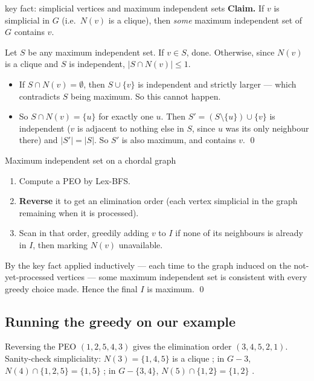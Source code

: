 \begin{facts}{key fact: simplicial vertices and maximum independent sets}
\textbf{Claim.} If $v$ is simplicial in $G$ (i.e.\ $N(v)$ is a clique), then \emph{some} maximum
independent set of $G$ contains $v$.

\prf Let $S$ be any maximum independent set. If $v\in S$, done. Otherwise, since $N(v)$ is a
clique and $S$ is independent, $|S\cap N(v)|\le1$.
\begin{itemize}
  \item If $S\cap N(v)=\emptyset$, then $S\cup\{v\}$ is independent and strictly larger --- which
        contradicts $S$ being maximum. So this cannot happen.
  \item So $S\cap N(v)=\{u\}$ for exactly one $u$. Then $S'=(S\setminus\{u\})\cup\{v\}$ is
        independent ($v$ is adjacent to nothing else in $S$, since $u$ was its only neighbour
        there) and $|S'|=|S|$. So $S'$ is also maximum, and contains $v$. \qed
\end{itemize}
\end{facts}

\begin{algo}{Maximum independent set on a chordal graph}
\begin{enumerate}
  \item Compute a PEO by Lex-BFS.
  \item \textbf{Reverse} it to get an elimination order (each vertex simplicial in the graph
        remaining when it is processed).
  \item Scan in that order, greedily adding $v$ to $I$ if none of its neighbours is already in
        $I$, then marking $N(v)$ unavailable.
\end{enumerate}
\end{algo}

\begin{correct}
By the key fact applied inductively --- each time to the graph induced on the not-yet-processed
vertices --- some maximum independent set is consistent with every greedy choice made. Hence the
final $I$ is maximum. \qed
\end{correct}

\subsection*{Running the greedy on our example}

Reversing the PEO $(1,2,5,4,3)$ gives the elimination order $(3,4,5,2,1)$. Sanity-check
simpliciality: $N(3)=\{1,4,5\}$ is a clique \checkmark; in $G-3$, $N(4)\cap\{1,2,5\}=\{1,5\}$
\checkmark; in $G-\{3,4\}$, $N(5)\cap\{1,2\}=\{1,2\}$ \checkmark.


